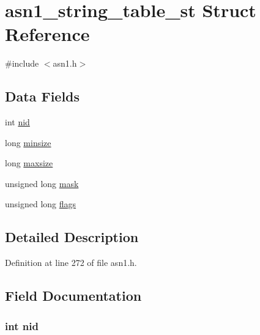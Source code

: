 \hypertarget{structasn1__string__table__st}{}\section{asn1\+\_\+string\+\_\+table\+\_\+st Struct Reference}
\label{structasn1__string__table__st}


{\ttfamily \#include $<$asn1.\+h$>$}

\subsection*{Data Fields}
\begin{DoxyCompactItemize}
\item 
int \hyperlink{structasn1__string__table__st_a7235ef62e89328f5155846dc59c6fc37}{nid}
\item 
long \hyperlink{structasn1__string__table__st_ac00d3c1a11701202e6df2849c21ad306}{minsize}
\item 
long \hyperlink{structasn1__string__table__st_a811e84ce3e3798025f4bfe5e44fa93dd}{maxsize}
\item 
unsigned long \hyperlink{structasn1__string__table__st_a5f12360f0fe15618db830b77200ac05d}{mask}
\item 
unsigned long \hyperlink{structasn1__string__table__st_a9e339c2784bd040b26a5112866700bff}{flags}
\end{DoxyCompactItemize}


\subsection{Detailed Description}


Definition at line 272 of file asn1.\+h.



\subsection{Field Documentation}
\subsubsection[{\texorpdfstring{nid}{nid}}]{\setlength{\rightskip}{0pt plus 5cm}int nid}\hypertarget{structasn1__string__table__st_a7235ef62e89328f5155846dc59c6fc37}{}\label{structasn1__string__table__st_a7235ef62e89328f5155846dc59c6fc37}


